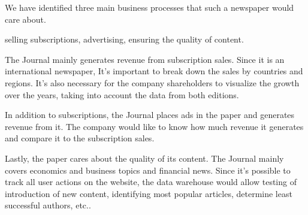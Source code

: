 
We have identified three main business processes that such a newspaper would care about.

selling subscriptions, advertising, ensuring the quality of content.

The Journal mainly generates revenue from subscription sales. Since it is an international newspaper, It’s important to break down the sales by countries and regions. It’s also necessary for the company shareholders to visualize the growth over the years, taking into account the data from both editions.

In addition to subscriptions, the Journal places ads in the paper and generates revenue from
it. The company would like to know how much revenue it generates and compare it to the
subscription sales.

Lastly, the paper cares about the quality of its content. The Journal mainly covers economics and business topics and financial news. Since it’s possible to track all user actions on the website, the data warehouse would allow testing of introduction of new content, identifying most popular articles, determine least successful authors, etc..


